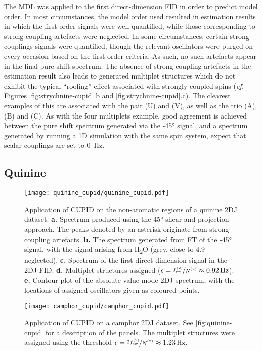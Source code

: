 The \ac{MDL} was applied to the first direct-dimension \ac{FID} in order to
predict model order. In most circumstances, the model order used resulted
in estimation results in which the first-order signals were well
quantified, while those corresponding to strong coupling artefacts were neglected.
In some circumstances, certain strong couplings signals were quantified, though
the relevant oscillators were purged on every occasion based on the first-order
criteria. As such, no such artefacts appear in the final pure shift spectrum.
The absence of strong coupling artefacts in the estimation result also leads to
generated multiplet structures which do not exhibit the typical ``roofing''
effect associated with strongly coupled spins (\textit{cf.} Figures
\ref{fig:strychnine-cupid}.b and \ref{fig:strychnine-cupid}.c). The clearest
examples of this are associated with the pair (U) and (V), as well as the trio (A),
(B) and (C). As with the four multiplets example, good agreement is achieved
between the pure shift spectrum generated via the \ang{-45} signal, and a
spectrum generated by running a \ac{1D} simulation with the same spin system,
expect that scalar couplings are set to \qty{0}{\hertz}.

\subsection{Quinine}
\begin{figure}
    \centering
    \texttt{[image: quinine\_cupid/quinine\_cupid.pdf]}
    \caption[
        Application of \acs{CUPID} on the non-aromatic regions of a quinine
        \acs{2DJ} dataset.
    ]{
        Application of \ac{CUPID} on the non-aromatic regions of a quinine
        \ac{2DJ} dataset.
        \textbf{a.} Spectrum produced using the \ang{45} shear and projection
        approach. The peaks denoted by an asterisk originate from strong
        coupling artefacts.
        \textbf{b.} The spectrum generated from \ac{FT} of the \ang{-45}
        signal, with the signal arising from H\textsubscript{2}O (grey, close
        to \qty{4.9}{\partspermillion} neglected).
        \textbf{c.} Spectrum of the first direct-dimension signal in the
        \ac{2DJ} \ac{FID}.
        \textbf{d.} Multiplet structures assigned ($\epsilon =
        \nicefrac{\fswtwo}{\Ntwo} \approx \qty{0.92}{\hertz}$).
        \textbf{e.} Contour plot of the absolute value mode \ac{2DJ} spectrum,
        with the locations of assigned oscillators given as coloured points.
    }
    \label{fig:quinine-cupid}
    \vspace{20pt}
    \texttt{[image: camphor\_cupid/camphor\_cupid.pdf]}%
    \caption[
        Application of \acs{CUPID} on a camphor dataset.
    ]{
        Application of \acs{CUPID} on a camphor \ac{2DJ} dataset.
        See \cref{fig:quinine-cupid} for a description of the panels.
        The multiplet structures were assigned using the threshold
        $\epsilon = \nicefrac{2 \fswtwo}{\Ntwo} \approx \qty{1.23}{\hertz}$.
    }
    \label{fig:camphor-cupid}%
\end{figure}

